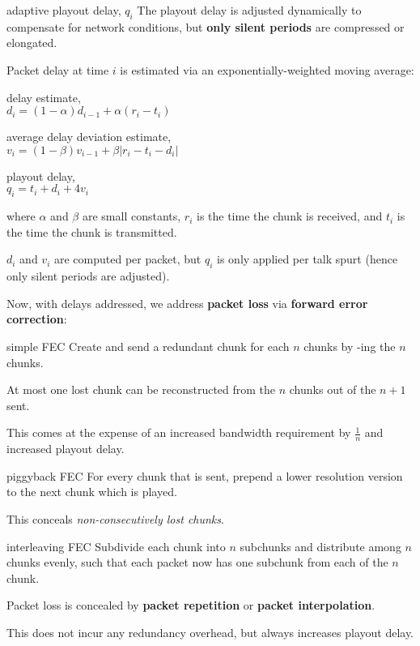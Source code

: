 \begin{defn}{adaptive playout delay, $q_i$}
    The playout delay is adjusted dynamically to compensate for network conditions, but 
    \textbf{only silent periods} are compressed or elongated.

    Packet delay at time $i$ is estimated via an exponentially-weighted moving average:

    delay estimate, \\ 
    $d_i = (1 - \alpha) d_{i - 1} + \alpha (r_i - t_i)$

    average delay deviation estimate, \\ 
    $v_i = (1 - \beta) v_{i - 1} + \beta |r_i - t_i - d_i|$

    playout delay, \\
    $q_i = t_i + d_i + 4v_i$

    where $\alpha$ and $\beta$ are small constants, $r_i$ is the time the chunk is received,
    and $t_i$ is the time the chunk is transmitted.

    $d_i$ and $v_i$ are computed per packet, but $q_i$ is only applied per talk spurt
    (hence only silent periods are adjusted).
\end{defn}

Now, with delays addressed, we address \textbf{packet loss} via \textbf{forward error correction}:

\begin{defn}{simple FEC}
    Create and send a redundant chunk for each $n$ chunks by -ing the $n$ chunks.

    At most one lost chunk can be reconstructed from the $n$ chunks out of the $n + 1$ sent.

    This comes at the expense of an increased bandwidth requirement by $\frac{1}{n}$ and increased playout delay.
\end{defn}

\begin{defn}{piggyback FEC}
    For every chunk that is sent, prepend a lower resolution version to the next chunk
    which is played.
    
    This conceals \textit{non-consecutively lost chunks}.
\end{defn}

\begin{defn}{interleaving FEC}
    Subdivide each chunk into $n$ subchunks and distribute among $n$ chunks evenly,
    such that each packet now has one subchunk from each of the $n$ chunk.

    Packet loss is concealed by \textbf{packet repetition} or \textbf{packet interpolation}.

    This does not incur any redundancy overhead, but always increases playout delay.
\end{defn}

